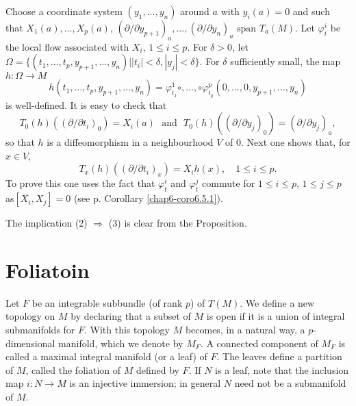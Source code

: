 Choose a coordinate system $(y_{1},\ldots,y_{n})$ around $a$ with $y_{i}(a)=0$ and such that $X_{1}(a),\ldots,X_{p}(a)$, $(\partial/\partial y_{p+1})_{a},\ldots,(\partial/\partial y_{n})_{a}\text{~span~} T_{a}(M)$. Let $\varphi^{i}_{t}$ be the local flow associated with $X_{i}$, $1\leq i\leq p$. For $\delta>0$, let $\Omega=\{(t_{1},\ldots,t_{p},y_{p+1},\ldots,y_{n})\big| |t_{i}|<\delta,|y_{j}|<\delta\}$. For $\delta$ sufficiently small, the map $h:\Omega\to M$
$$
h(t_{1},\ldots,t_{p},y_{p+1},\ldots,y_{n})=\varphi^{1}_{t_{1}}\circ,\ldots,\circ\varphi^{p}_{t_{p}}(0,\ldots,0,y_{p+1},\ldots,y_{n})
$$
is well-defined. It is easy to check that
$$
T_{0}(h)\left((\partial/\partial t_{i})_{0}\right)=X_{i}(a)\text{~ and~ } T_{0}(h)\left((\partial/\partial y_{j})_{0}\right)=(\partial/\partial y_{j})_{a},
$$
so that $h$ is a diffeomorphism in a neighbourhood $V$ of $0$. Next one shows that, for $x\in V$,
$$
T_{x}(h)\left((\partial/\partial t_{i})_{x}\right)=X_{i}h(x),\quad 1\leq i\leq p.
$$
To prove this one uses the fact that $\varphi^{i}_{t}$ and $\varphi^{j}_{t}$ commute for $1\leq i\leq p$, $1\leq j\leq p$ as\pageoriginale $[X_{i},X_{j}]=0$ (see p.\pageref{page26} Corollary \ref{chap6-coro6.5.1}).

The implication (2) $\Rightarrow$ (3) is clear from the Proposition.

\section*{Foliatoin}

Let $F$ be an integrable subbundle (of rank $p$) of $T(M)$. We define a new topology on $M$ by declaring that a subset of $M$ is open if it is a union of integral submanifolds for $F$. With this topology $M$ becomes, in a natural way, a $p$-dimensional manifold, which we denote by $M_{F}$. A connected component of $M_{F}$ is called a maximal integral manifold (or a leaf) of $F$. The leaves define a partition of $M$, called the foliation of $M$ defined by $F$. If $N$ is a leaf, note that the inclusion map $i:N\to M$ is an injective immersion; in general $N$ need not be a submanifold of $M$.







